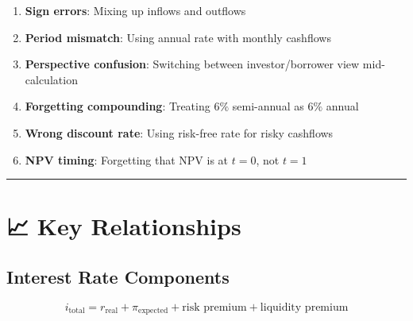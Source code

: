 \documentclass[
  letterpaper,
]{scrbook}
\providecommand{\tightlist}{%
  \setlength{\itemsep}{0pt}\setlength{\parskip}{0pt}}
\begin{document}

\begin{tcolorbox}[enhanced jigsaw, toptitle=1mm, colbacktitle=quarto-callout-warning-color!10!white, opacityback=0, leftrule=.75mm, breakable, colframe=quarto-callout-warning-color-frame, toprule=.15mm, opacitybacktitle=0.6, coltitle=black, bottomrule=.15mm, colback=white, arc=.35mm, titlerule=0mm, rightrule=.15mm, left=2mm, title=\textcolor{quarto-callout-warning-color}{\faExclamationTriangle}\hspace{0.5em}{Mistakes to Avoid}, bottomtitle=1mm]

\begin{enumerate}
\def\labelenumi{\arabic{enumi}.}
\tightlist
\item
  \textbf{Sign errors}: Mixing up inflows and outflows
\item
  \textbf{Period mismatch}: Using annual rate with monthly cashflows
\item
  \textbf{Perspective confusion}: Switching between investor/borrower
  view mid-calculation
\item
  \textbf{Forgetting compounding}: Treating \(6\%\) semi-annual as
  \(6\%\) annual
\item
  \textbf{Wrong discount rate}: Using risk-free rate for risky cashflows
\item
  \textbf{NPV timing}: Forgetting that NPV is at \(t=0\), not \(t=1\)
\end{enumerate}

\end{tcolorbox}

\begin{center}\rule{0.5\linewidth}{0.5pt}\end{center}

\section*{📈 Key Relationships}\label{key-relationships}


\subsection*{Interest Rate Components}\label{interest-rate-components-1}

\[
i_{\text{total}} = r_{\text{real}} + \pi_{\text{expected}} + \text{risk premium} + \text{liquidity premium}
\]
\end{document}
